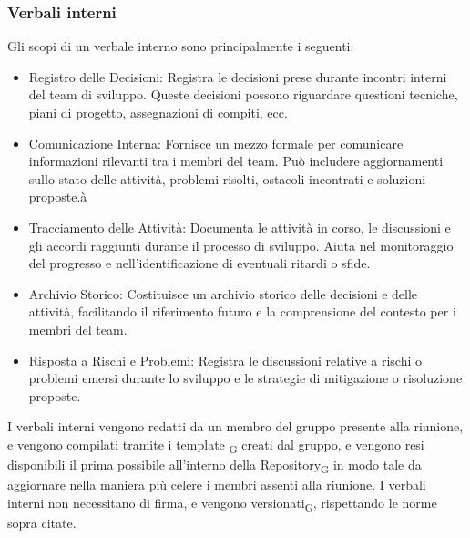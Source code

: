 \documentclass{article}
\begin{document}
\subsubsection{Verbali interni}
Gli scopi di un verbale interno sono principalmente i seguenti:
\begin{itemize}
    \item Registro delle Decisioni: Registra le decisioni prese durante incontri interni del team di sviluppo. Queste decisioni possono riguardare questioni tecniche, piani di progetto, assegnazioni di compiti, ecc.
    \item Comunicazione Interna: Fornisce un mezzo formale per comunicare informazioni rilevanti tra i membri del team. Può includere aggiornamenti sullo stato delle attività, problemi risolti, ostacoli incontrati e soluzioni proposte.à
    \item Tracciamento delle Attività: Documenta le attività in corso, le discussioni e gli accordi raggiunti durante il processo di sviluppo. Aiuta nel monitoraggio del progresso e nell'identificazione di eventuali ritardi o sfide.
    \item Archivio Storico: Costituisce un archivio storico delle decisioni e delle attività, facilitando il riferimento futuro e la comprensione del contesto per i membri del team.
    \item Risposta a Rischi e Problemi: Registra le discussioni relative a rischi o problemi emersi durante lo sviluppo e le strategie di mitigazione o risoluzione proposte.
\end{itemize}

I verbali interni vengono redatti da un membro del gruppo presente alla riunione, e vengono compilati tramite i template \textsubscript{G} creati dal gruppo, e vengono resi disponibili il prima possibile all'interno della Repository\textsubscript{G} in modo tale da aggiornare nella maniera più celere i membri assenti alla riunione. I verbali interni non necessitano di firma, e vengono versionati\textsubscript{G}, rispettando le norme sopra citate.
\end{document}
